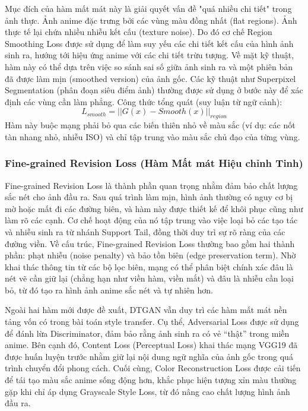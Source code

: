 Mục đích của hàm mất mát này là giải quyết vấn đề "quá nhiều chi tiết" trong ảnh thực. 
Ảnh anime đặc trưng bởi các vùng màu đồng nhất (flat regions). Ảnh thực tế lại chứa nhiều nhiễu kết cấu (texture noise).
Do đó cơ chế Region Smoothing Loss được sử dụng để làm suy yếu các chi tiết kết cấu của hình ảnh sinh ra, hướng tới hiệu ứng anime với các chi tiết trừu tượng.
Về mặt kỹ thuật, hàm này có thể dựa trên việc so sánh sai số giữa ảnh sinh ra và một phiên bản đã được làm mịn (smoothed version) của ảnh gốc. Các kỹ thuật như Superpixel Segmentation (phân đoạn siêu điểm ảnh) thường được sử dụng ở bước này để xác định các vùng cần làm phẳng.
Công thức tổng quát (suy luận từ ngữ cảnh):
\begin{equation}
L_{smooth} = || G(x) - Smooth(x) ||_{region}
\end{equation}
Hàm này buộc mạng phải bỏ qua các biến thiên nhỏ về màu sắc (ví dụ: các nốt tàn nhang nhỏ, nhiễu ISO) và chỉ tập trung vào màu sắc chủ đạo của từng vùng.

\subsubsection{Fine-grained Revision Loss (Hàm Mất mát Hiệu chỉnh Tinh)}
Fine-grained Revision Loss là thành phần quan trọng nhằm đảm bảo chất lượng sắc nét cho ảnh đầu ra. Sau quá trình làm mịn, hình ảnh thường có nguy cơ bị mờ hoặc mất đi các đường biên, và hàm này được thiết kế để khôi phục cũng như làm rõ các cạnh. Cơ chế hoạt động của nó tập trung vào việc loại bỏ các tạo tác và nhiễu sinh ra từ nhánh Support Tail, đồng thời duy trì sự rõ ràng của các đường viền. Về cấu trúc, Fine-grained Revision Loss thường bao gồm hai thành phần: phạt nhiễu (noise penalty) và bảo tồn biên (edge preservation term). Nhờ khai thác thông tin từ các bộ lọc biên, mạng có thể phân biệt chính xác đâu là nét vẽ cần giữ lại (chẳng hạn như viền hàm, viền mắt) và đâu là nhiễu cần loại bỏ, từ đó tạo ra hình ảnh anime sắc nét và tự nhiên hơn.

Ngoài hai hàm mới được đề xuất, DTGAN vẫn duy trì các hàm mất mát nền tảng vốn có trong bài toán style transfer. Cụ thể, Adversarial Loss được sử dụng để đánh lừa Discriminator, đảm bảo rằng ảnh sinh ra có vẻ “thật” trong miền anime. Bên cạnh đó, Content Loss (Perceptual Loss) khai thác mạng VGG19 đã được huấn luyện trước nhằm giữ lại nội dung ngữ nghĩa của ảnh gốc trong quá trình chuyển đổi phong cách. Cuối cùng, Color Reconstruction Loss được cải tiến để tái tạo màu sắc anime sống động hơn, khắc phục hiện tượng xỉn màu thường gặp khi chỉ áp dụng Grayscale Style Loss, từ đó nâng cao chất lượng hình ảnh đầu ra.


